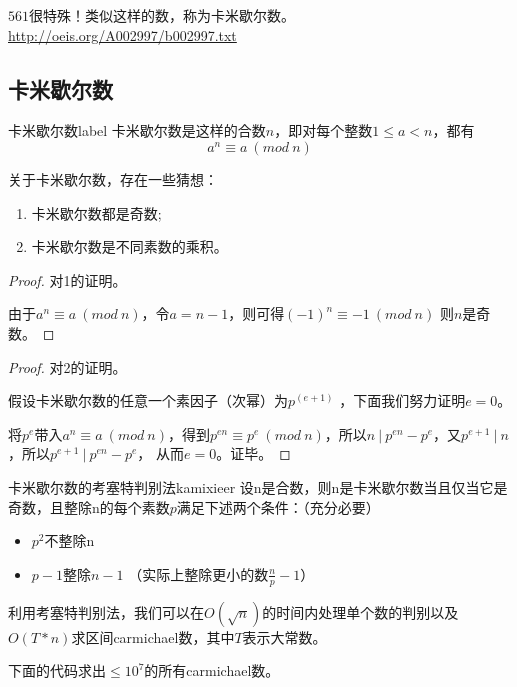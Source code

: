 $561$很特殊！类似这样的数，称为卡米歇尔数。\href{http://oeis.org/A002997/b002997.txt}{http://oeis.org/A002997/b002997.txt}

\subsection{卡米歇尔数}

\begin{definition}{卡米歇尔数}{label}
	卡米歇尔数是这样的合数$n$，即对每个整数$1\le a < n$，都有
	$$
		a^n \equiv a \ (mod \ n)
	$$
\end{definition}

关于卡米歇尔数，存在一些猜想：

{\heiti
\begin{enumerate}
	\item 卡米歇尔数都是奇数;
	\item 卡米歇尔数是不同素数的乘积。
\end{enumerate}
}

\begin{proof}
	对1的证明。
	
	由于$a^n\equiv a \ (mod \ n)$，令$a=n-1$，则可得$(-1)^n\equiv -1 \ (mod \ n)$  则$n$是奇数。
\end{proof}

\begin{proof}
	对2的证明。
	
	假设卡米歇尔数的任意一个素因子（次幂）为$p^{(e+1)}$ ，下面我们努力证明$e=0$。
	
	将$p^e$带入$a^n\equiv a \ (mod \ n)$，得到$p^{en}\equiv p^e \ (mod \ n)$，所以$n \ | \ p^{en}-p^e$，又$p^{e+1} \ | \ n$，所以$p^{e+1} \ | \ p^{en}-p^e$，
	从而$e=0$。证毕。
\end{proof}


\begin{theorem}{卡米歇尔数的考塞特判别法}{kamixieer}
	设n是合数，则n是卡米歇尔数当且仅当它是奇数，且整除n的每个素数$p$满足下述两个条件：（充分必要）
	\begin{itemize}
		\item $p^2 $不整除n
		\item $p-1$整除$n-1$ （实际上整除更小的数$\frac{n}{p}-1$）
	\end{itemize}
\end{theorem}

利用考塞特判别法，我们可以在$O(\sqrt{n})$的时间内处理单个数的判别以及$O(T*n)$求区间carmichael数，其中$T$表示大常数。

下面的代码求出$\le 10^7$的所有carmichael数。


